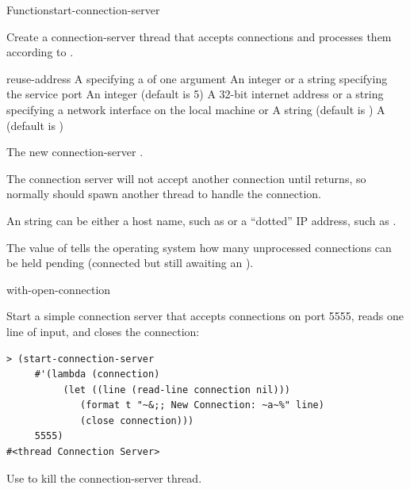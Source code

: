 \documentclass[10pt,twoside,english,pdftex]{article}
\begin{document}
\begin{functiondoc}{Function}{start-connection-server}%
  {
     
    \returns{} }
%
%
%
%

\fnsyntax

\fnpurpose Create a connection-server thread that accepts connections
and processes them according to .

\fnpackage {}

\fnmodule {}

\fnargs
\begin{args}{reuse-address}
\arg[function] A  specifying a 
   of one argument
\arg[port] An integer or a string specifying the service port
\arg[backlog] An integer (default is 5)
\arg[interface] A 32-bit internet address or a string specifying a network 
interface on the local machine or \nil 
\arg[name] A string (default is )
 A  (default is \nil)
\end{args}

\fnreturns The new connection-server .

\fnerrors
\nothreads{}

%
\fndescription The connection server will not accept another
connection until  returns, so normally
 should spawn another thread to handle the
connection.  

An  string can be either a host name, such as
 or a ``dotted'' IP address, such as .

The value of  tells the operating system
how many unprocessed connections can be held pending (connected but
still awaiting an \textbf{}).

\begin{alsos}{with-open-connection}
\end{alsos}

\fnexample
Start a simple connection server that accepts connections on port
5555, reads one line of input, and closes the connection:
%
\W\supp
\begin{verbatim}
> (start-connection-server
     #'(lambda (connection)
          (let ((line (read-line connection nil)))
             (format t "~&;; New Connection: ~a~%" line)
             (close connection)))
     5555)
#<thread Connection Server>
\end{verbatim}

%
\fnnote
Use \textbf{} to kill the connection-server thread.

\end{functiondoc}
\end{document}
